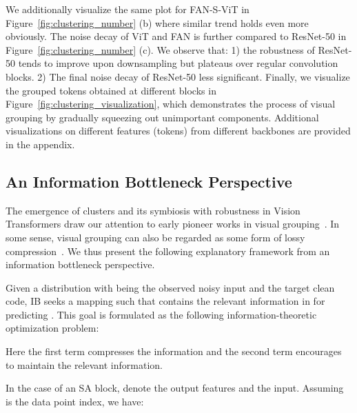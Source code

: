 \documentclass[nohyperref]{article}
\theoremstyle{plain}
\theoremstyle{definition}
\theoremstyle{remark}
\begin{document}
We additionally visualize the same plot for FAN-S-ViT in Figure~\ref{fig:clustering_number} (b) where similar trend holds even more obviously. The noise decay of ViT and FAN is further compared to ResNet-50 in Figure~\ref{fig:clustering_number} (c). We observe that: 1) the robustness of ResNet-50 tends to improve upon downsampling but plateaus over regular convolution blocks. 2) The final noise decay of ResNet-50 less significant. Finally, we visualize the grouped tokens obtained at different blocks in Figure~\ref{fig:clustering_visualization}, which demonstrates the process of visual grouping by gradually squeezing out unimportant components. 
Additional visualizations on different features (tokens) from different backbones are provided in the appendix.




\subsection{An Information Bottleneck Perspective}
\label{sec:explain}

The emergence of clusters and its symbiosis with robustness in Vision Transformers draw our attention to early pioneer works in visual grouping~\cite{grouping,buhmann1999image}. In some sense, visual grouping can also be regarded as some form of lossy compression~\cite{yang2008unsupervised}. We thus present the following explanatory framework from an information bottleneck perspective. 

Given a  distribution  with  being the observed noisy input and  the target clean code, IB seeks a mapping  such that  contains the relevant information in  for predicting . This goal is formulated as the following information-theoretic optimization problem:

\vspace{-0.1cm}
\begin{small}

\end{small}

\vspace{-0.3cm}
Here the first term compresses the information  and the second term encourages to maintain the  relevant information. 

In the case of an SA block,  denote the output features and  the input. 
Assuming  is the data point index, we have:
  
 
\end{document}
